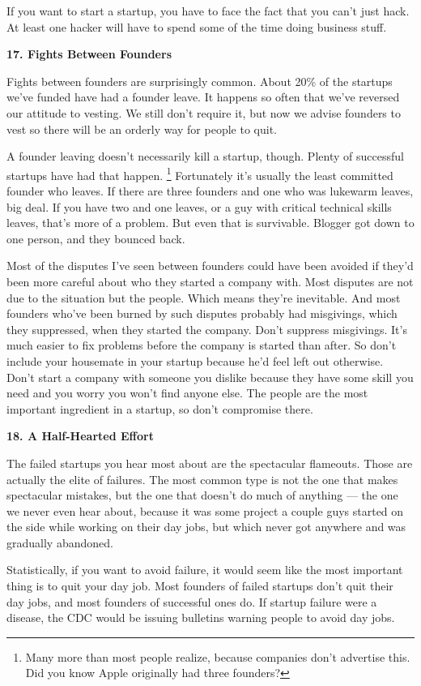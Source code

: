 If you want to start a startup, you have to face the fact that you can't
just hack. At least one hacker will have to spend some of the time doing
business stuff.

\textbf{17. Fights Between Founders}

Fights between founders are surprisingly common. About 20\% of the
startups we've funded have had a founder leave. It happens so often that
we've reversed our attitude to vesting. We still don't require it, but
now we advise founders to vest so there will be an orderly way for
people to quit.

A founder leaving doesn't necessarily kill a startup, though. Plenty of
successful startups have had that happen. \footnote{Many more than most people realize, because companies don't
advertise this. Did you know Apple originally had three founders?}
Fortunately it's usually the least committed founder who leaves. If
there are three founders and one who was lukewarm leaves, big deal. If
you have two and one leaves, or a guy with critical technical skills
leaves, that's more of a problem. But even that is survivable. Blogger
got down to one person, and they bounced back.

Most of the disputes I've seen between founders could have been avoided
if they'd been more careful about who they started a company with. Most
disputes are not due to the situation but the people. Which means
they're inevitable. And most founders who've been burned by such
disputes probably had misgivings, which they suppressed, when they
started the company. Don't suppress misgivings. It's much easier to fix
problems before the company is started than after. So don't include your
housemate in your startup because he'd feel left out otherwise. Don't
start a company with someone you dislike because they have some skill
you need and you worry you won't find anyone else. The people are the
most important ingredient in a startup, so don't compromise there.

\textbf{18. A Half-Hearted Effort}

The failed startups you hear most about are the spectacular flameouts.
Those are actually the elite of failures. The most common type is not
the one that makes spectacular mistakes, but the one that doesn't do
much of anything --- the one we never even hear about, because it was
some project a couple guys started on the side while working on their
day jobs, but which never got anywhere and was gradually abandoned.

Statistically, if you want to avoid failure, it would seem like the most
important thing is to quit your day job. Most founders of failed
startups don't quit their day jobs, and most founders of successful ones
do. If startup failure were a disease, the CDC would be issuing
bulletins warning people to avoid day jobs.


